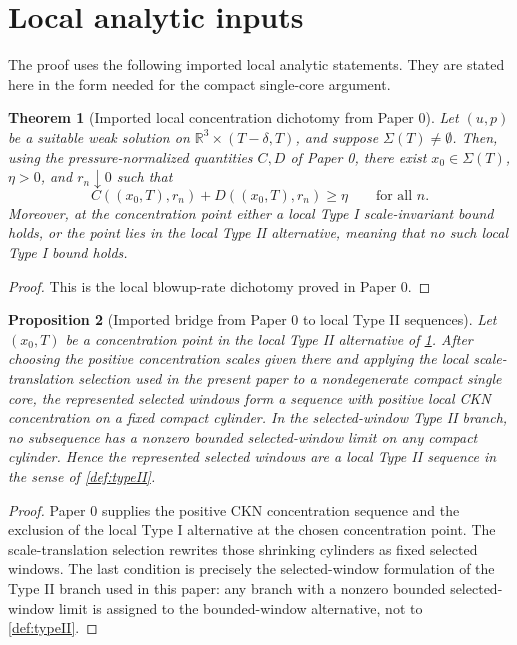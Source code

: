 \documentclass[11pt]{amsart}
\theoremstyle{plain}
\newtheorem{theorem}{Theorem}[section]
\newtheorem{proposition}[theorem]{Proposition}
\theoremstyle{definition}
\theoremstyle{remark}
\begin{document}
\section{Local analytic inputs}

The proof uses the following imported local analytic statements.  They are
stated here in the form needed for the compact single-core argument.

\begin{theorem}[Imported local concentration dichotomy from Paper 0]
\label{thm:paper0-dichotomy}
Let \((u,p)\) be a suitable weak solution on
\(\mathbb R^3\times(T-\delta,T)\), and suppose \(\Sigma(T)\ne\emptyset\).
Then, using the pressure-normalized quantities \(C,D\) of Paper 0, there exist
\(x_0\in\Sigma(T)\), \(\eta>0\), and \(r_n\downarrow0\) such that
\[
  C((x_0,T),r_n)+D((x_0,T),r_n)\ge\eta
  \qquad\text{for all }n.
\]
Moreover, at the concentration point either a local Type I scale-invariant
bound holds, or the point lies in the local Type II alternative, meaning that
no such local Type I bound holds.
\end{theorem}

\begin{proof}
This is the local blowup-rate dichotomy proved in Paper 0.
\end{proof}

\begin{proposition}[Imported bridge from Paper 0 to local Type II sequences]
\label{prop:paper0-typeII-bridge}
Let \((x_0,T)\) be a concentration point in the local Type II alternative of
\cref{thm:paper0-dichotomy}.  After choosing the positive concentration scales
given there and applying the local scale-translation selection used in the
present paper to a nondegenerate compact single core, the represented selected
windows form a sequence with positive local CKN concentration on a fixed compact
cylinder.  In the selected-window Type II branch, no subsequence has a nonzero
bounded selected-window limit on any compact cylinder.  Hence the represented
selected windows are a local Type II sequence in the sense of \cref{def:typeII}.
\end{proposition}

\begin{proof}
Paper 0 supplies the positive CKN concentration sequence and the exclusion of
the local Type I alternative at the chosen concentration point.  The
scale-translation selection rewrites those shrinking cylinders as fixed
selected windows.  The last condition is precisely the selected-window
formulation of the Type II branch used in this paper: any branch with a nonzero
bounded selected-window limit is assigned to the bounded-window alternative,
not to \cref{def:typeII}.
\end{proof}
\end{document}
